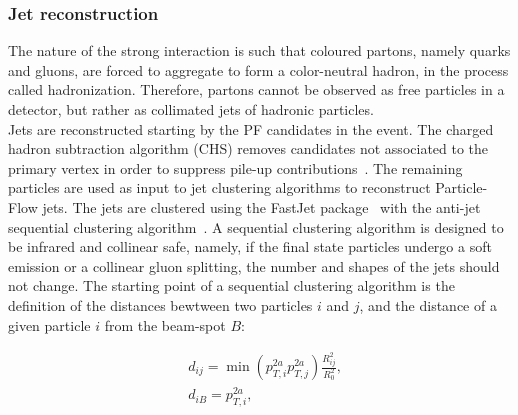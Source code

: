 \subsubsection{Jet reconstruction}
The nature of the strong interaction is such that coloured partons, namely quarks and gluons, are forced to aggregate to form a color-neutral hadron, in the process called hadronization. Therefore, partons cannot be observed as free particles in a detector, but rather as collimated jets of hadronic particles.\\
Jets are reconstructed starting by the PF candidates in the event. The charged hadron subtraction algorithm (CHS) removes candidates not associated to the primary vertex in order to suppress pile-up contributions~\cite{CMS-PAS-JME-14-001}. The remaining particles are used as input to jet clustering algorithms
to reconstruct Particle-Flow jets. The jets are clustered using the {\sc FastJet} package~\cite{Cacciari:2011ma} with the anti-\kt jet sequential clustering algorithm~\cite{Cacciari:2008gp}. A sequential clustering algorithm is designed to be infrared and collinear safe, namely, if the final state particles undergo a soft emission or a collinear gluon splitting, the number and shapes of the jets should not change. The starting point of a sequential clustering algorithm is the definition of the distances bewtween two particles $i$ and $j$, and the distance of a given particle $i$ from the beam-spot $B$:

\begin{equation}
\begin{split}
& d_{ij} = \min \left( p_{T,i}^{2a} p_{T,j}^{2a} \right) \frac{R_{ij}^2}{R_0^2},\\
& d_{iB} = p_{T,i}^{2a},\\
\end{split}
\label{eq:dist_akt}
\end{equation}

